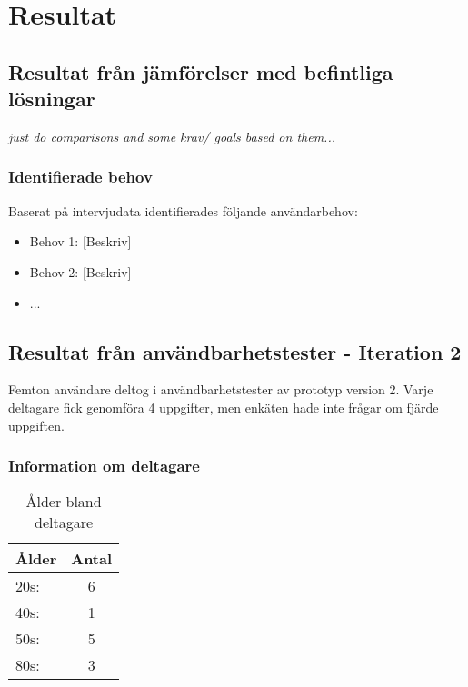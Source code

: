 \section{Resultat}
\label{sec:resultat_test}

\subsection{Resultat från jämförelser med befintliga lösningar}

\textit{just do comparisons and some krav/ goals based on them...}


\subsubsection{Identifierade behov}

Baserat på intervjudata identifierades följande användarbehov:
\begin{itemize}
    \item Behov 1: [Beskriv]
    \item Behov 2: [Beskriv]
    \item ...
\end{itemize}


\subsection{Resultat från användbarhetstester - Iteration 2}

Femton användare deltog i användbarhetstester av prototyp version 2. Varje deltagare fick genomföra 4 uppgifter, men enkäten hade inte frågar om fjärde uppgiften. 

\subsubsection{Information om deltagare}

\begin{table}[H]
\centering
\begin{tabular}{|l|c|}
\hline
\textbf{Ålder} & \textbf{Antal} \\
\hline
20s:  & 6  \\ 
40s:  & 1  \\
50s:  & 5  \\
80s:  & 3  \\
\hline
\end{tabular}
\caption{Ålder bland deltagare}
\label{tab:age1}
\end{table}

